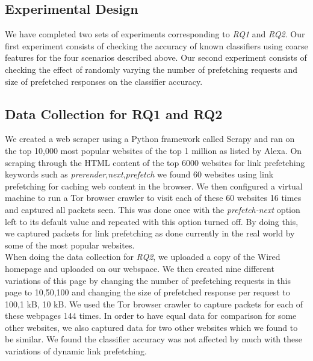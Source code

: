 \subsection{Experimental Design}
We have completed two sets of experiments corresponding to \emph{RQ1} and
\emph{RQ2}. Our first experiment consists of checking the accuracy of
known classifiers using coarse features for the four scenarios described
above. Our second experiment consists of checking the effect of randomly
varying the number of prefetching requests and size of prefetched
responses on the classifier accuracy.

\subsection{Data Collection for RQ1 and RQ2}
We created a web scraper using a Python framework called
Scrapy\cite{scrapy} and ran on the top 10,000 most popular websites of
the top 1 million as
listed by Alexa\cite{alexa-top}. On scraping through the HTML content of
the top 6000 websites for link prefetching keywords such as
\textit{prerender},\textit{next},\textit{prefetch} we found 60 websites
using link prefetching for caching web content in the browser. We then
configured a virtual machine to run a Tor browser crawler\cite{tor-browser-crawler} to visit each
of these 60 websites 16 times and captured all packets seen. This was
done once with the \textit{prefetch-next} option left to its default
value and repeated with this option turned off. By doing this, we
captured packets for link prefetching as done currently in the real
world by some of the most popular websites. \\
When doing the data collection for \emph{RQ2}, we uploaded a copy of
the Wired homepage\cite{wired} and uploaded on our
webspace\cite{tj-wired}. We then created nine different variations of
this page by changing the number of prefetching requests in this page to
10,50,100 and changing the size of prefetched response per request to
100,1 kB, 10 kB. We used the Tor browser
crawler\cite{tor-browser-crawler} to capture packets for each of these
webpages 144 times. In order to have equal data for comparison for some
other websites, we also captured data for two other websites which we
found to be similar.
We found the classifier accuracy was not affected by much with these variations of dynamic link prefetching. 


